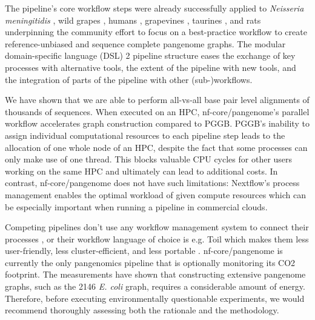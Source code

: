 \documentclass{bioinfo}
\theoremstyle{definition}
\begin{document}
	The pipeline’s core workflow steps were already successfully applied to \textit{Neisseria meningitidis} \citep{Yang2023}, wild grapes \citep{Cochetel2023}, humans \citep{Guarracino2023, Liao2023}, grapevines \citep{Guo2024}, taurines \citep{Milia2024}, and rats \citep{Villani2024} underpinning the community effort to focus on a best-practice workflow to create reference-unbiased and sequence complete pangenome graphs. 
	The modular domain-specific language (DSL) 2 pipeline structure eases the exchange of key processes with alternative tools, the extent of the pipeline with new tools, and the integration of parts of the pipeline with other (sub-)workflows.
	
	We have shown that we are able to perform all-vs-all base pair level alignments of thousands of sequences. 
	When executed on an HPC, nf-core/pangenome’s parallel workflow accelerates graph construction compared to PGGB. 
	PGGB’s inability to assign individual computational resources to each pipeline step leads to the allocation of one whole node of an HPC, despite the fact that some processes can only make use of one thread. 
	This blocks valuable CPU cycles for other users working on the same HPC and ultimately can lead to additional costs.
	In contrast, %
	nf-core/pangenome does not have such limitations: 
	Nextflow’s process management enables the optimal workload of given compute resources which can be especially important when running a pipeline in commercial clouds. %
	
	Competing pipelines don’t use any workflow management system to connect their processes \citep{Chin2023}, or their workflow language of choice is e.g. Toil \citep{Vivian2017, Hickey2023} which makes them less user-friendly, less cluster-efficient, and less portable \citep{Wratten2021}.
	nf-core/pangenome is currently the only pangenomics pipeline that is optionally monitoring its CO2 footprint. 
	The measurements have shown that constructing extensive pangenome graphs, such as the 2146 \textit{E. coli} graph, requires a considerable amount of energy. 
	Therefore, before executing environmentally questionable experiments, we would recommend thoroughly assessing both the rationale and the methodology. 
	
\end{document}

